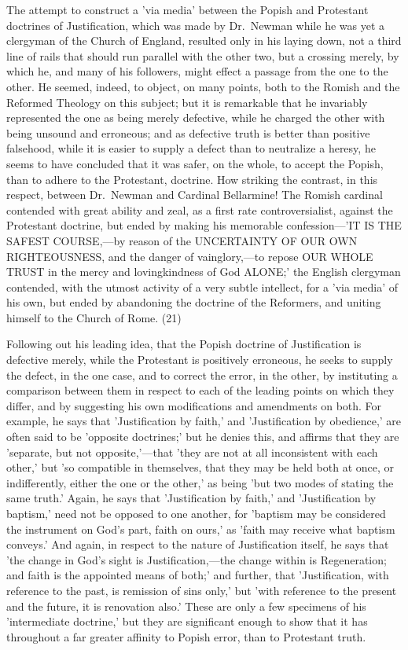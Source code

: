 \documentclass[
]{book}
\begin{document}
The attempt to construct a 'via media' between the Popish and Protestant doctrines of Justification, which was made by Dr.~Newman while he was yet a clergyman of the Church of England, resulted only in his laying down, not a third line of rails that should run parallel with the other two, but a crossing merely, by which he, and many of his followers, might effect a passage from the one to the other. He seemed, indeed, to object, on many points, both to the Romish and the Reformed Theology on this subject; but it is remarkable that he invariably represented the one as being merely defective, while he charged the other with being unsound and erroneous; and as defective truth is better than positive falsehood, while it is easier to supply a defect than to neutralize a heresy, he seems to have concluded that it was safer, on the whole, to accept the Popish, than to adhere to the Protestant, doctrine. How striking the contrast, in this respect, between Dr.~Newman and Cardinal Bellarmine! The Romish cardinal contended with great ability and zeal, as a first rate controversialist, against the Protestant doctrine, but ended by making his memorable confession---'IT IS THE SAFEST COURSE,---by reason of the UNCERTAINTY OF OUR OWN RIGHTEOUSNESS, and the danger of vainglory,---to repose OUR WHOLE TRUST in the mercy and lovingkindness of God ALONE;' the English clergyman contended, with the utmost activity of a very subtle intellect, for a 'via media' of his own, but ended by abandoning the doctrine of the Reformers, and uniting himself to the Church of Rome. (21)

Following out his leading idea, that the Popish doctrine of Justification is defective merely, while the Protestant is positively erroneous, he seeks to supply the defect, in the one case, and to correct the error, in the other, by instituting a comparison between them in respect to each of the leading points on which they differ, and by suggesting his own modifications and amendments on both. For example, he says that 'Justification by faith,' and 'Justification by obedience,' are often said to be 'opposite doctrines;' but he denies this, and affirms that they are 'separate, but not opposite,'---that 'they are not at all inconsistent with each other,' but 'so compatible in themselves, that they may be held both at once, or indifferently, either the one or the other,' as being 'but two modes of stating the same truth.' Again, he says that 'Justification by faith,' and 'Justification by baptism,' need not be opposed to one another, for 'baptism may be considered the instrument on God's part, faith on ours,' as 'faith may receive what baptism conveys.' And again, in respect to the nature of Justification itself, he says that 'the change in God's sight is Justification,---the change within is Regeneration; and faith is the appointed means of both;' and further, that 'Justification, with reference to the past, is remission of sins only,' but 'with reference to the present and the future, it is renovation also.' These are only a few specimens of his 'intermediate doctrine,' but they are significant enough to show that it has throughout a far greater affinity to Popish error, than to Protestant truth.
\end{document}
